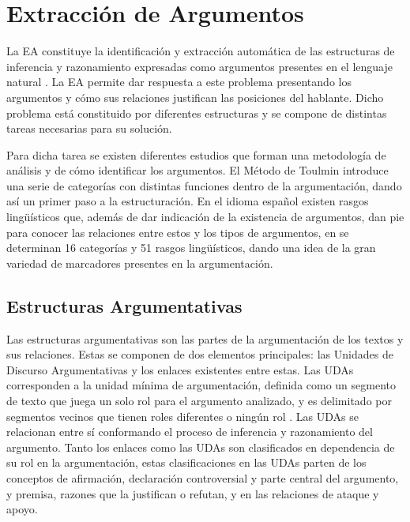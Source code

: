 \documentclass[a4paper,11pt,twocolumn,twoside]{article}
\begin{document}


\section{Extracción de Argumentos} %

La EA constituye la identificación y extracción 
automática de las estructuras de inferencia y 
razonamiento expresadas como argumentos presentes en el lenguaje natural \cite{lawrence2020argument}.
La EA permite dar respuesta a este problema presentando
los argumentos y cómo sus relaciones justifican las posiciones del hablante. Dicho problema está constituido por diferentes 
estructuras y se compone de distintas tareas necesarias para su solución.

Para dicha tarea se existen diferentes estudios que forman una metodología de análisis y de cómo 
identificar los argumentos. El Método de Toulmin \cite{toulmin_2003} introduce una serie de categorías 
con distintas funciones dentro de la argumentación, dando así un primer paso a la estructuración. En 
el idioma español existen rasgos lingüísticos que, además de dar indicación de la existencia de argumentos, 
dan pie para conocer las relaciones entre estos y los tipos de argumentos, en \cite{venegas2005hacia}
se determinan 16 categorías y 51 rasgos lingüísticos, dando una idea de la gran variedad de marcadores 
presentes en la argumentación.

\subsection{Estructuras Argumentativas}

Las estructuras argumentativas son las partes de la argumentación de los textos y sus relaciones.
Estas se componen de dos elementos principales: las Unidades de Discurso Argumentativas y los enlaces
existentes entre estas. Las UDAs corresponden a la unidad mínima de argumentación, definida 
como un segmento de texto que juega un solo rol para el argumento analizado, y es 
delimitado por segmentos vecinos que tienen roles diferentes o ningún rol \cite{stede2018argumentation}.
Las UDAs se relacionan entre sí conformando el proceso de inferencia y razonamiento del argumento.
Tanto los enlaces como las UDAs son clasificados en dependencia de su rol en la argumentación, estas clasificaciones 
en las UDAs parten de los conceptos de afirmación, declaración controversial y parte central del argumento, y premisa,
razones que la justifican o refutan, y en las relaciones de ataque y apoyo. 
\end{document}
